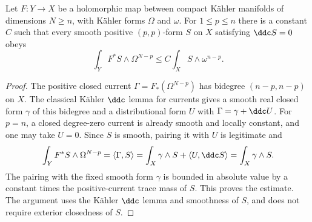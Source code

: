 \begin{lemma}\label{lem:smooth-pluriharmonic-pullback-mass}
Let $F:Y\to X$ be a holomorphic map between compact K\"ahler manifolds of dimensions $N\geq n$, with K\"ahler forms $\Omega$ and $\omega$. For $1\leq p\leq n$ there is a constant $C$ such that every smooth positive $(p,p)$-form $S$ on $X$ satisfying $\ddc S=0$ obeys
\[
 \int_Y F^*S\wedge\Omega^{N-p}
 \leq C\int_X S\wedge\omega^{n-p}.
\]
\end{lemma}
\begin{proof}
The positive closed current $\Gamma=F_*(\Omega^{N-p})$ has bidegree $(n-p,n-p)$ on $X$. The classical K\"ahler $\ddc$ lemma for currents gives a smooth real closed form $\gamma$ of this bidegree and a distributional form $U$ with $\Gamma=\gamma+\ddc U$. For $p=n$, a closed degree-zero current is already smooth and locally constant, and one may take $U=0$. Since $S$ is smooth, pairing it with $U$ is legitimate and
\[
 \int_Y F^*S\wedge\Omega^{N-p}
 =\langle\Gamma,S\rangle
 =\int_X\gamma\wedge S+\langle U,\ddc S\rangle
 =\int_X\gamma\wedge S.
\]
The pairing with the fixed smooth form $\gamma$ is bounded in absolute value by a constant times the positive-current trace mass of $S$. This proves the estimate. The argument uses the K\"ahler $\ddc$ lemma and smoothness of $S$, and does not require exterior closedness of $S$.
\end{proof}
